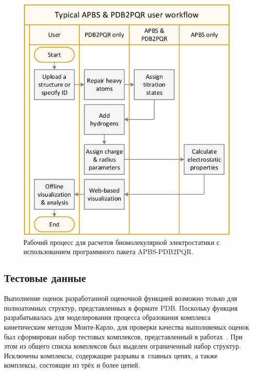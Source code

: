 \begin{figure}
\begin{center}
	\includegraphics[width=1.0\textwidth]{images/pdb2pqr.jpg}
	\caption{Рабочий процесс для расчетов биомолекулярной электростатики с использованием программного пакета APBS-PDB2PQR.}
    \label{pdb2pqr}
\end{center}
\end{figure}

\newpage
\subsection{Тестовые данные}


Выполнение оценок разработанной оценочной функцией возможно только для полноатомных структур, представленных в формате PDB. Поскольку функция разрабатывалась для моделирования процесса образования комплекса кинетическим методом Монте-Карло, для проверки качества выполняемых оценок был сформирован набор тестовых комплексов, представленный в работах~\cite{biom10071056, rate}. При этом из общего списка комплексов был выделен ограниченный набор структур. Исключены комплексы, содержащие разрывы в~главных цепях, а также комплексы, состоящие из трёх и более цепей. 

